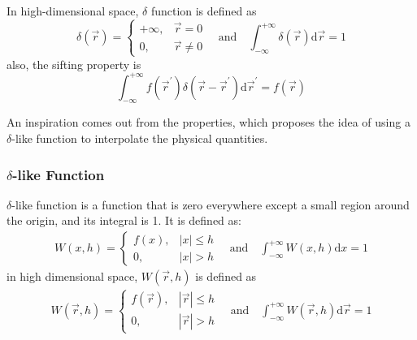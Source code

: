 In high-dimensional space, $\delta$ function is defined as
\begin{equation}
    \delta(\vec{r})=
    \begin{cases}
        +\infty, & \vec{r} = 0 \\
        0, & \vec{r} \neq 0
    \end{cases}
    \quad \text{and} \quad
    \int_{-\infty}^{+\infty} \delta(\vec{r}) \mathrm{d}\vec{r} = 1
\end{equation}
also, the sifting property is
\begin{equation}
    \int_{-\infty}^{+\infty} f(\vec{r}^\prime) \delta(\vec{r} - \vec{r}^\prime)\mathrm{d}\vec{r}^\prime = f(\vec{r})
\end{equation}

An inspiration comes out from the properties, 
which proposes the idea of using a $\delta$-like function to interpolate the physical quantities.

\subsubsection{$\delta$-like Function}

$\delta$-like function is a function that is zero everywhere except a small region around the origin,
and its integral is 1. It is defined as:
\begin{equation}
    \begin{aligned}
        W(x,h) = 
        \begin{cases}
            f(x), & |x| \leq h \\
            0, & |x| > h
        \end{cases}
        \quad \text{and} \quad
        \int_{-\infty}^{+\infty} W(x,h) \mathrm{d}x = 1
    \end{aligned}
\end{equation}
in high dimensional space, $W(\vec{r},h)$ is defined as
\begin{equation}
    \begin{aligned}
        W(\vec{r},h) = 
        \begin{cases}
            f(\vec{r}), & |\vec{r}| \leq h \\
            0, & |\vec{r}| > h
        \end{cases}
        \quad \text{and} \quad
        \int_{-\infty}^{+\infty} W(\vec{r},h) \mathrm{d}\vec{r} = 1
    \end{aligned}
\end{equation}

